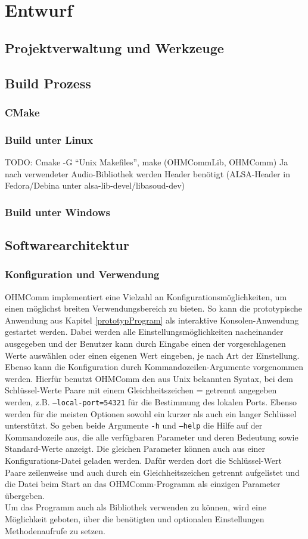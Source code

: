 \chapter{Entwurf}
\section{Projektverwaltung und Werkzeuge}
\section{Build Prozess}
\subsection{CMake}
\subsection{Build unter Linux}
TODO: Cmake -G ``Unix Makefiles'', make (OHMCommLib, OHMComm)
Ja nach verwendeter Audio-Bibliothek werden Header benötigt (ALSA-Header in Fedora/Debina unter alsa-lib-devel/libasoud-dev)
\subsection{Build unter Windows}
\section{Softwarearchitektur}
\subsection{Konfiguration und Verwendung}
OHMComm implementiert eine Vielzahl an Konfigurationsmöglichkeiten, um einen möglichst breiten Verwendungsbereich zu bieten. So kann die prototypische Anwendung aus Kapitel \ref{prototypProgram} als interaktive Konsolen-Anwendung gestartet werden. Dabei werden alle Einstellungsmöglichkeiten nacheinander ausgegeben und der Benutzer kann durch Eingabe einen der vorgeschlagenen Werte auswählen oder einen eigenen Wert eingeben, je nach Art der Einstellung.
\\
Ebenso kann die Konfiguration durch Kommandozeilen-Argumente vorgenommen werden. Hierfür benutzt OHMComm den aus Unix bekannten Syntax, bei dem Schlüssel-Werte Paare mit einem Gleichheitszeichen = getrennt angegeben werden, z.B. \texttt{--local-port=54321} für die Bestimmung des lokalen Ports. Ebenso werden für die meisten Optionen sowohl ein kurzer als auch ein langer Schlüssel unterstützt. So geben beide Argumente \texttt{-h} und \texttt{--help} die Hilfe auf der Kommandozeile aus, die alle verfügbaren Parameter und deren Bedeutung sowie Standard-Werte anzeigt. Die gleichen Parameter können auch aus einer Konfigurations-Datei geladen werden. Dafür werden dort die Schlüssel-Wert Paare zeilenweise und auch durch ein Gleichheitszeichen getrennt aufgelistet und die Datei beim Start an das OHMComm-Programm als einzigen Parameter übergeben.
\\
Um das Programm auch als Bibliothek verwenden zu können, wird eine Möglichkeit geboten, über die benötigten und optionalen Einstellungen Methodenaufrufe zu setzen. %

